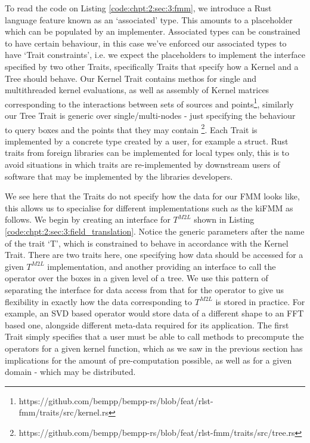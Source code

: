 To read the code on Listing \ref{code:chpt:2:sec:3:fmm}, we introduce a Rust language feature known as an `associated' type. This amounts to a placeholder which can be populated by an implementer. Associated types can be constrained to have certain behaviour, in this case we've enforced our associated types to have `Trait constraints', i.e. we expect the placeholders to implement the interface specified by two other Traits, specifically Traits that specify how a Kernel and a Tree should behave. Our Kernel Trait contains methos for single and multithreaded kernel evaluations, as well as assembly of Kernel matrices corresponding to the interactions between sets of sources and points\footnote{https://github.com/bempp/bempp-rs/blob/feat/rlst-fmm/traits/src/kernel.rs}, similarly our Tree Trait is generic over single/multi-nodes - just specifying the behaviour to query boxes and the points that they may contain \footnote{https://github.com/bempp/bempp-rs/blob/feat/rlst-fmm/traits/src/tree.rs}. Each Trait is implemented by a concrete type created by a user, for example a struct. Rust traits from foreign libraries can be implemented for local types only, this is to avoid situations in which traits are re-implemented by downstream users of software that may be implemented by the libraries developers.

We see here that the Traits do not specify how the data for our FMM looks like, this allows us to specialise for different implementations such as the kiFMM as follows. We begin by creating an interface for $T^{M2L}$ shown in Listing \ref{code:chpt:2:sec:3:field_translation}. Notice the generic parameters after the name of the trait `T', which is constrained to behave in accordance with the Kernel Trait. There are two traits here, one specifying how data should be accessed for a given $T^{M2L}$ implementation, and another providing an interface to call the operator over the boxes in a given level of a tree. We use this pattern of separating the interface for data access from that for the operator to give us flexibility in exactly how the data corresponding to $T^{M2L}$ is stored in practice. For example, an SVD based operator would store data of a different shape to an FFT based one, alongside different meta-data required for its application. The first Trait simply specifies that a user must be able to call methods to precompute the operators for a given kernel function, which as we saw in the previous section has implications for the amount of pre-computation possible, as well as for a given domain - which may be distributed.

